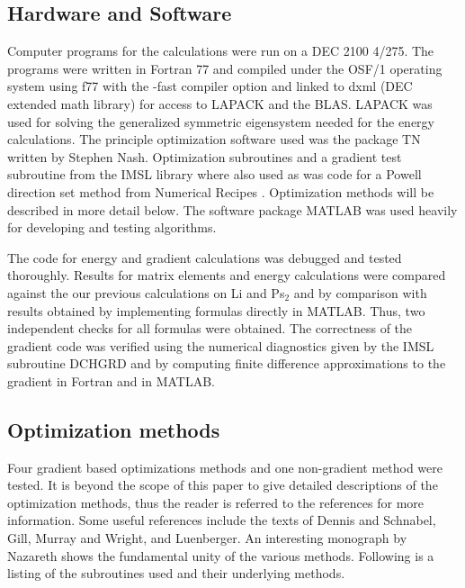 \documentclass[12pt,thmsa]{article}
\begin{document}
\subsection{Hardware and Software}

Computer programs for the calculations were run on a DEC 2100 4/275. The
programs were written in Fortran 77 and compiled under the OSF/1 operating
system using f77 with the -fast compiler option and linked to dxml (DEC
extended math library) for access to LAPACK\cite{LAPACK} and the BLAS.
LAPACK was used for solving the generalized symmetric eigensystem needed for
the energy calculations. The principle optimization software used was the
package TN written by Stephen Nash\cite{NashTN}. Optimization subroutines
and a gradient test subroutine from the IMSL\cite{IMSL} library where also
used as was code for a Powell direction set method from Numerical Recipes%
\cite{NRinFortran}. Optimization methods will be described in more detail
below. The software package MATLAB\cite{MATLAB} was used heavily for
developing and testing algorithms.

The code for energy and gradient calculations was debugged and tested
thoroughly. Results for matrix elements and energy calculations were
compared against the our previous calculations on Li and Ps$_2$\cite
{Kinghorn93} and by comparison with results obtained by implementing
formulas directly in MATLAB. Thus, two independent checks for all formulas
were obtained. The correctness of the gradient code was verified using the
numerical diagnostics given by the IMSL subroutine DCHGRD and by computing
finite difference approximations to the gradient in Fortran and in MATLAB.

\subsection{Optimization methods}

Four gradient based optimizations methods and one non-gradient method were
tested. It is beyond the scope of this paper to give detailed descriptions
of the optimization methods, thus the reader is referred to the references
for more information. Some useful references include the texts of Dennis and
Schnabel\cite{DennisSchnabel83}, Gill, Murray and Wright\cite
{GillMurrayWright81}, and Luenberger\cite{Luenberger84}. An interesting
monograph by Nazareth\cite{Nazareth94} shows the fundamental unity of the
various methods. Following is a listing of the subroutines used and their
underlying methods.
\end{document}

